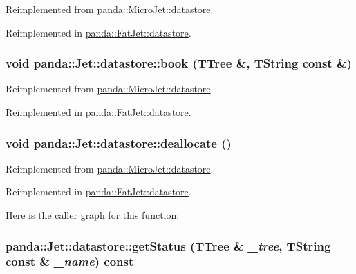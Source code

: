 Reimplemented from \hyperlink{structpanda_1_1MicroJet_1_1datastore_a09aae2ebbbda55c6616b6a693f43bb66}{panda::MicroJet::datastore}.

Reimplemented in \hyperlink{structpanda_1_1FatJet_1_1datastore_a5df5d3f7ed3b3d1d70f99dcb6a9c25e4}{panda::FatJet::datastore}.\hypertarget{structpanda_1_1Jet_1_1datastore_a6b3a8bbeb4fa9c002c5eebbd97962095}{
\subsubsection[{book}]{\setlength{\rightskip}{0pt plus 5cm}void panda::Jet::datastore::book (TTree \&, \/  TString const \&)}}
\label{structpanda_1_1Jet_1_1datastore_a6b3a8bbeb4fa9c002c5eebbd97962095}


Reimplemented from \hyperlink{structpanda_1_1MicroJet_1_1datastore_a1a17e11396756ae30ac63c834cbe5976}{panda::MicroJet::datastore}.

Reimplemented in \hyperlink{structpanda_1_1FatJet_1_1datastore_abc4532c13b6be8b1feaf70e3504f5f59}{panda::FatJet::datastore}.\hypertarget{structpanda_1_1Jet_1_1datastore_a606415eee51c1a38fc0613f3b2946d1e}{
\subsubsection[{deallocate}]{\setlength{\rightskip}{0pt plus 5cm}void panda::Jet::datastore::deallocate ()}}
\label{structpanda_1_1Jet_1_1datastore_a606415eee51c1a38fc0613f3b2946d1e}


Reimplemented from \hyperlink{structpanda_1_1MicroJet_1_1datastore_a03473e3dcba5abe73c123ce2c1d3292c}{panda::MicroJet::datastore}.

Reimplemented in \hyperlink{structpanda_1_1FatJet_1_1datastore_ae981e60d6fc142e3bbb4730a8a856fa7}{panda::FatJet::datastore}.

Here is the caller graph for this function:\hypertarget{structpanda_1_1Jet_1_1datastore_ac3a9ecd013ec5d5bf94f71ff013e5491}{
\subsubsection[{getStatus}]{ panda::Jet::datastore::getStatus (TTree \& {\em \_\-tree}, \/  TString const \& {\em \_\-name}) const}}
\label{structpanda_1_1Jet_1_1datastore_ac3a9ecd013ec5d5bf94f71ff013e5491}



